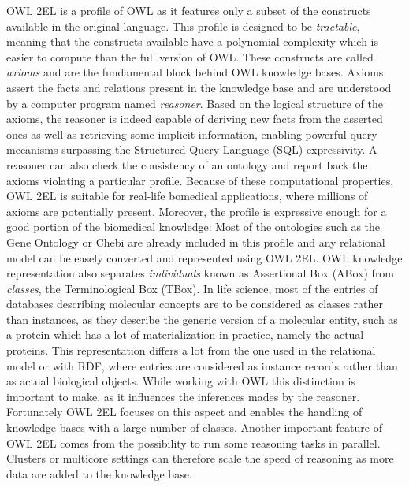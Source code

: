 \documentclass{bioinfo}
\begin{document}
OWL 2EL is a profile of OWL as it features only a subset of the constructs available in the original language. This profile is
designed to be \emph{tractable}, meaning that the constructs available have a polynomial complexity which is easier to compute than the full 
version of OWL. These constructs are called \emph{axioms} and are the fundamental block behind OWL knowledge bases. 
Axioms assert the facts and relations present in the knowledge base and are understood by a computer program named \emph{reasoner}. 
Based on the logical structure of the axioms, the reasoner is indeed capable of deriving new facts from the asserted ones as well as retrieving
some implicit information, enabling powerful query mecanisms surpassing the Structured Query Language (SQL) expressivity. 
A reasoner can also check the consistency of an ontology and report back the axioms violating a particular profile. Because of 
these computational properties, OWL 2EL is suitable for real-life bomedical applications, where millions of axioms are potentially present.
Moreover, the profile is expressive enough for a good portion of the biomedical knowledge: Most of the ontologies such as the Gene Ontology or 
Chebi
are already included in this profile and any relational model can be easely converted and represented using OWL 2EL. OWL knowledge representation
also separates \emph{individuals} known as Assertional Box (ABox) from \emph{classes}, the Terminological Box (TBox). In life
science, most of the entries of databases describing molecular concepts are to be considered as classes rather than instances, as they describe 
the generic version of
a molecular entity, such as a protein which has a lot of materialization in practice, namely the actual proteins. 
This representation differs a lot from the one used in the relational model or with RDF, where entries are considered as instance 
records rather than as actual biological objects.
While working with OWL this distinction is important to make, as it influences the inferences mades by the reasoner. Fortunately OWL 2EL focuses
on this aspect and enables the handling of knowledge bases with a large number of classes. Another important feature of OWL 2EL comes from the
possibility to run some reasoning tasks in parallel. Clusters or multicore settings can therefore scale the speed of reasoning as more data 
are added to the knowledge base.
\end{document}
